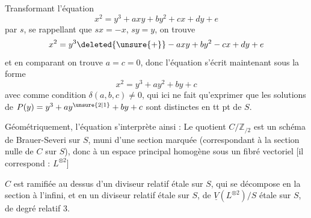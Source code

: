 Transformant l'équation
\[
x^2=y^3+axy+by^2+cx+dy+e
\]
par $s$,  se rappellant que $sx=-x$, $sy=y$, on trouve
\[
x^2=y^3\deleted{\unsure{+}}-axy+by^2-cx+dy+e
\]
et en comparant on trouve $a=c=0$, donc l'équation s'écrit maintenant sous la forme
\[
\boxed{x^2=y^3+ay^2+by+c}
\]
avec comme condition $\delta(a,b,c)\ne0$, qui ici ne fait qu'exprimer que les solutions de $P(y)=y^3+ay^{\unsure{2|1}}+by+c$ sont distinctes en tt pt de $S$.

Géométriquement,  l'équation s'interprète ainsi : Le quotient $C/\mathbb Z_{/2}$ est un schéma de Brauer-Severi  sur $S$, muni d'une section marquée (correspondant à la section nulle de $C$ sur $S$), donc    à un espace principal homogène sous un   fibré vectoriel   [il correspond : $L^{\otimes2}$]

$C$ est ramifiée  au dessus d'un diviseur relatif  étale sur $S$, qui se décompose en la section à l'infini, et en un diviseur  relatif  étale sur $S$,  de  $\underline V(L^{\otimes2})/S$ étale sur $S$, de degré relatif 3.
